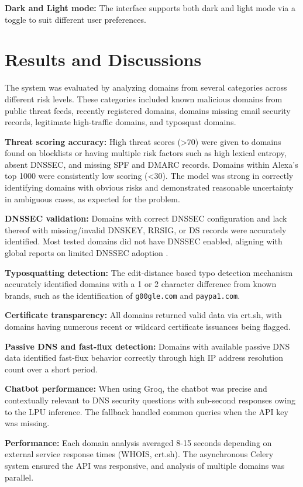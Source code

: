 \documentclass[12pt, a4paper, oneside]{report}
\begin{document}
\textbf{Dark and Light mode:} The interface supports both dark and light mode via a toggle to suit different user preferences.

\section{Results and Discussions}

The system was evaluated by analyzing domains from several categories across different risk levels. These categories included known malicious domains from public threat feeds, recently registered domains, domains missing email security records, legitimate high-traffic domains, and typosquat domains.

\textbf{Threat scoring accuracy:} High threat scores (>70) were given to domains found on blocklists or having multiple risk factors such as high lexical entropy, absent DNSSEC, and missing SPF and DMARC records. Domains within Alexa's top 1000 were consistently low scoring (<30). The model was strong in correctly identifying domains with obvious risks and demonstrated reasonable uncertainty in ambiguous cases, as expected for the problem.

\textbf{DNSSEC validation:} Domains with correct DNSSEC configuration and lack thereof with missing/invalid DNSKEY, RRSIG, or DS records were accurately identified. Most tested domains did not have DNSSEC enabled, aligning with global reports on limited DNSSEC adoption \cite{dnssec_adoption2023}.

\textbf{Typosquatting detection:} The edit-distance based typo detection mechanism accurately identified domains with a 1 or 2 character difference from known brands, such as the identification of \texttt{g00gle.com} and \texttt{paypa1.com}.

\textbf{Certificate transparency:} All domains returned valid data via crt.sh, with domains having numerous recent or wildcard certificate issuances being flagged.

\textbf{Passive DNS and fast-flux detection:} Domains with available passive DNS data identified fast-flux behavior correctly through high IP address resolution count over a short period.

\textbf{Chatbot performance:} When using Groq, the chatbot was precise and contextually relevant to DNS security questions with sub-second responses owing to the LPU inference. The fallback handled common queries when the API key was missing.

\textbf{Performance:} Each domain analysis averaged 8-15 seconds depending on external service response times (WHOIS, crt.sh). The asynchronous Celery system ensured the API was responsive, and analysis of multiple domains was parallel.
\end{document}

